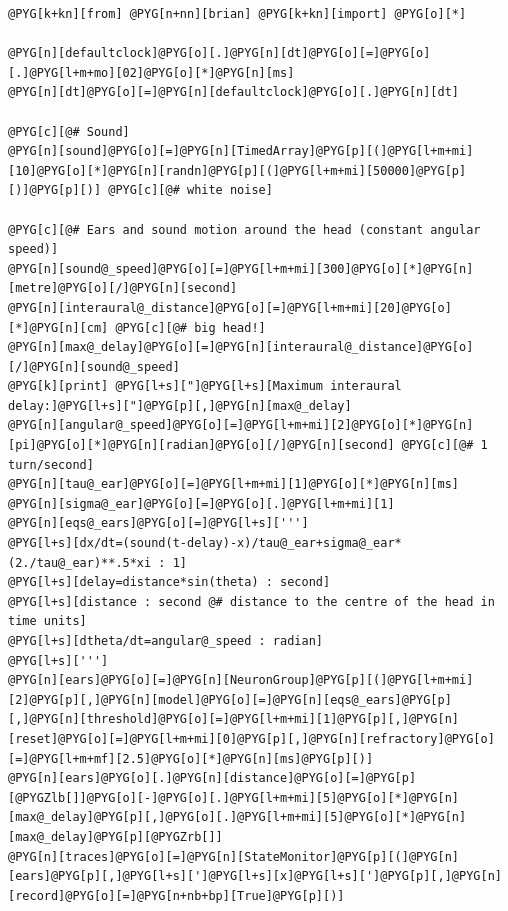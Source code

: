 \documentclass[letterpaper,10pt,english]{manual}
\begin{document}
\begin{Verbatim}[commandchars=@\[\]]
@PYG[k+kn][from] @PYG[n+nn][brian] @PYG[k+kn][import] @PYG[o][*]

@PYG[n][defaultclock]@PYG[o][.]@PYG[n][dt]@PYG[o][=]@PYG[o][.]@PYG[l+m+mo][02]@PYG[o][*]@PYG[n][ms]
@PYG[n][dt]@PYG[o][=]@PYG[n][defaultclock]@PYG[o][.]@PYG[n][dt]

@PYG[c][@# Sound]
@PYG[n][sound]@PYG[o][=]@PYG[n][TimedArray]@PYG[p][(]@PYG[l+m+mi][10]@PYG[o][*]@PYG[n][randn]@PYG[p][(]@PYG[l+m+mi][50000]@PYG[p][)]@PYG[p][)] @PYG[c][@# white noise]

@PYG[c][@# Ears and sound motion around the head (constant angular speed)]
@PYG[n][sound@_speed]@PYG[o][=]@PYG[l+m+mi][300]@PYG[o][*]@PYG[n][metre]@PYG[o][/]@PYG[n][second]
@PYG[n][interaural@_distance]@PYG[o][=]@PYG[l+m+mi][20]@PYG[o][*]@PYG[n][cm] @PYG[c][@# big head!]
@PYG[n][max@_delay]@PYG[o][=]@PYG[n][interaural@_distance]@PYG[o][/]@PYG[n][sound@_speed]
@PYG[k][print] @PYG[l+s]["]@PYG[l+s][Maximum interaural delay:]@PYG[l+s]["]@PYG[p][,]@PYG[n][max@_delay]
@PYG[n][angular@_speed]@PYG[o][=]@PYG[l+m+mi][2]@PYG[o][*]@PYG[n][pi]@PYG[o][*]@PYG[n][radian]@PYG[o][/]@PYG[n][second] @PYG[c][@# 1 turn/second]
@PYG[n][tau@_ear]@PYG[o][=]@PYG[l+m+mi][1]@PYG[o][*]@PYG[n][ms]
@PYG[n][sigma@_ear]@PYG[o][=]@PYG[o][.]@PYG[l+m+mi][1]
@PYG[n][eqs@_ears]@PYG[o][=]@PYG[l+s][''']
@PYG[l+s][dx/dt=(sound(t-delay)-x)/tau@_ear+sigma@_ear*(2./tau@_ear)**.5*xi : 1]
@PYG[l+s][delay=distance*sin(theta) : second]
@PYG[l+s][distance : second @# distance to the centre of the head in time units]
@PYG[l+s][dtheta/dt=angular@_speed : radian]
@PYG[l+s][''']
@PYG[n][ears]@PYG[o][=]@PYG[n][NeuronGroup]@PYG[p][(]@PYG[l+m+mi][2]@PYG[p][,]@PYG[n][model]@PYG[o][=]@PYG[n][eqs@_ears]@PYG[p][,]@PYG[n][threshold]@PYG[o][=]@PYG[l+m+mi][1]@PYG[p][,]@PYG[n][reset]@PYG[o][=]@PYG[l+m+mi][0]@PYG[p][,]@PYG[n][refractory]@PYG[o][=]@PYG[l+m+mf][2.5]@PYG[o][*]@PYG[n][ms]@PYG[p][)]
@PYG[n][ears]@PYG[o][.]@PYG[n][distance]@PYG[o][=]@PYG[p][@PYGZlb[]]@PYG[o][-]@PYG[o][.]@PYG[l+m+mi][5]@PYG[o][*]@PYG[n][max@_delay]@PYG[p][,]@PYG[o][.]@PYG[l+m+mi][5]@PYG[o][*]@PYG[n][max@_delay]@PYG[p][@PYGZrb[]]
@PYG[n][traces]@PYG[o][=]@PYG[n][StateMonitor]@PYG[p][(]@PYG[n][ears]@PYG[p][,]@PYG[l+s][']@PYG[l+s][x]@PYG[l+s][']@PYG[p][,]@PYG[n][record]@PYG[o][=]@PYG[n+nb+bp][True]@PYG[p][)]


\end{Verbatim}
\end{document}
